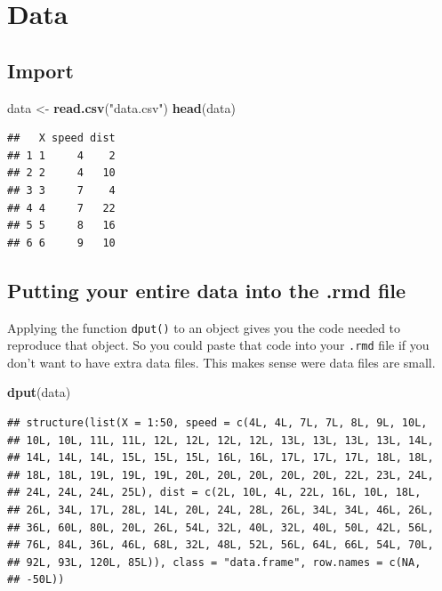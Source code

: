 \documentclass[
  12pt,
]{article}
\newenvironment{Shaded}{\begin{snugshade}}{\end{snugshade}}
\newcommand{\KeywordTok}[1]{\textcolor[rgb]{0.13,0.29,0.53}{\textbf{#1}}}
\newcommand{\NormalTok}[1]{#1}
\newcommand{\StringTok}[1]{\textcolor[rgb]{0.31,0.60,0.02}{#1}}
\begin{document}
\hypertarget{data}{%
\section{Data}\label{data}}

\hypertarget{import}{%
\subsection{Import}\label{import}}

\begin{Shaded}
\begin{Highlighting}[]
\NormalTok{data <-}\StringTok{ }\KeywordTok{read.csv}\NormalTok{(}\StringTok{"data.csv"}\NormalTok{)}
\KeywordTok{head}\NormalTok{(data)}
\end{Highlighting}
\end{Shaded}

\begin{verbatim}
##   X speed dist
## 1 1     4    2
## 2 2     4   10
## 3 3     7    4
## 4 4     7   22
## 5 5     8   16
## 6 6     9   10
\end{verbatim}

\hypertarget{putting-your-entire-data-into-the-.rmd-file}{%
\subsection{Putting your entire data into the .rmd file}\label{putting-your-entire-data-into-the-.rmd-file}}

Applying the function \texttt{dput()} to an object gives you the code needed to reproduce that object. So you could paste that code into your \texttt{.rmd} file if you don't want to have extra data files. This makes sense were data files are small.

\begin{Shaded}
\begin{Highlighting}[]
\KeywordTok{dput}\NormalTok{(data)}
\end{Highlighting}
\end{Shaded}

\begin{verbatim}
## structure(list(X = 1:50, speed = c(4L, 4L, 7L, 7L, 8L, 9L, 10L, 
## 10L, 10L, 11L, 11L, 12L, 12L, 12L, 12L, 13L, 13L, 13L, 13L, 14L, 
## 14L, 14L, 14L, 15L, 15L, 15L, 16L, 16L, 17L, 17L, 17L, 18L, 18L, 
## 18L, 18L, 19L, 19L, 19L, 20L, 20L, 20L, 20L, 20L, 22L, 23L, 24L, 
## 24L, 24L, 24L, 25L), dist = c(2L, 10L, 4L, 22L, 16L, 10L, 18L, 
## 26L, 34L, 17L, 28L, 14L, 20L, 24L, 28L, 26L, 34L, 34L, 46L, 26L, 
## 36L, 60L, 80L, 20L, 26L, 54L, 32L, 40L, 32L, 40L, 50L, 42L, 56L, 
## 76L, 84L, 36L, 46L, 68L, 32L, 48L, 52L, 56L, 64L, 66L, 54L, 70L, 
## 92L, 93L, 120L, 85L)), class = "data.frame", row.names = c(NA, 
## -50L))
\end{verbatim}
\end{document}
